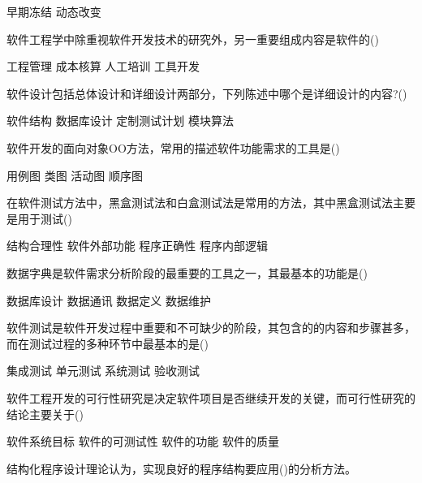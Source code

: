 \documentclass{exam}
\begin{document}
\begin{questions}
\begin{oneparchoices}
		\choice 早期冻结
		\choice 动态改变
	\end{oneparchoices}
	\question 软件工程学中除重视软件开发技术的研究外，另一重要组成内容是软件的()\\
	\begin{oneparchoices}
		\correctchoice 工程管理
		\choice 成本核算
		\choice 人工培训
		\choice 工具开发
	\end{oneparchoices}
	\question 软件设计包括总体设计和详细设计两部分，下列陈述中哪个是详细设计的内容?()\\
	\begin{oneparchoices}
		\choice 软件结构
		\choice 数据库设计
		\choice 定制测试计划
		\correctchoice 模块算法
	\end{oneparchoices}
	\question 软件开发的面向对象OO方法，常用的描述软件功能需求的工具是()\\
	\begin{oneparchoices}
		\correctchoice 用例图
		\choice 类图
		\choice 活动图
		\choice 顺序图
	\end{oneparchoices}
	\question 在软件测试方法中，黑盒测试法和白盒测试法是常用的方法，其中黑盒测试法主要是用于测试()\\
	\begin{oneparchoices}
		\choice 结构合理性
		\correctchoice 软件外部功能
		\choice 程序正确性
		\choice 程序内部逻辑
	\end{oneparchoices}
	\question 数据字典是软件需求分析阶段的最重要的工具之一，其最基本的功能是()\\
	\begin{oneparchoices}
		\choice 数据库设计
		\choice 数据通讯
		\correctchoice 数据定义
		\choice 数据维护
	\end{oneparchoices}
	\question 软件测试是软件开发过程中重要和不可缺少的阶段，其包含的的内容和步骤甚多，而在测试过程的多种环节中最基本的是()\\
	\begin{oneparchoices}
		\choice 集成测试
		\correctchoice 单元测试
		\choice 系统测试
		\choice 验收测试
	\end{oneparchoices}
	\question 软件工程开发的可行性研究是决定软件项目是否继续开发的关键，而可行性研究的结论主要关于()\\
	\begin{oneparchoices}
		\correctchoice 软件系统目标
		\choice 软件的可测试性
		\choice 软件的功能
		\choice 软件的质量
	\end{oneparchoices}
	\question 结构化程序设计理论认为，实现良好的程序结构要应用()的分析方法。\\

\end{questions}
\end{document}
